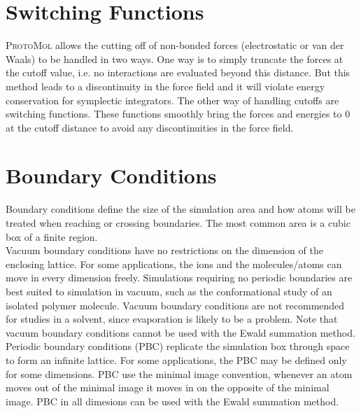 \documentclass[11pt]{report}
\newcommand{\ProtoMol}{\textsc{ProtoMol }}
\begin{document}
\begin{appendix}

\section{Switching Functions}
\ProtoMol allows the cutting off of non-bonded forces (electrostatic or van der
Waals) to be handled in two ways. One way is to simply truncate the forces at
the cutoff value, i.e. no interactions are evaluated beyond this distance.  But
this method leads to a discontinuity in the force field and it will violate
energy conservation for symplectic integrators.  The other way of handling
cutoffs are switching functions. These functions smoothly bring the forces and
energies to 0 at the cutoff distance to avoid any discontinuities in the force
field. \\



\section{Boundary Conditions}
Boundary conditions define the size of the simulation area and how
atoms will be treated when reaching or crossing boundaries. The most
common area is a cubic box of a finite region.\\
  
Vacuum boundary conditions have no restrictions on the dimension of the
enclosing lattice.  For some applications, the ions and the molecules/atoms can
move in every dimension freely.  Simulations requiring no periodic boundaries
are best suited to simulation in vacuum, such as the conformational study of an
isolated polymer molecule.  Vacuum boundary conditions are not recommended for
studies in a solvent, since evaporation is likely to be a problem.  Note that
vacuum boundary conditions cannot be used with the Ewald summation method. \\

Periodic boundary conditions (PBC) replicate the simulation box
through space to form an infinite lattice. For some applications, the
PBC may be defined only for some dimensions. PBC use the minimal
image convention, whenever an atom moves out of the minimal image it
moves in on the opposite of the minimal image. PBC in all dimesions can
be used with the Ewald summation method. \\


\end{appendix}
\end{document}
